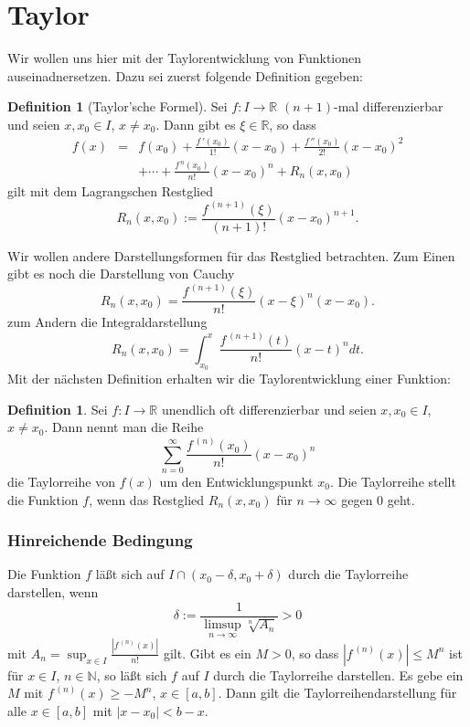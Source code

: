 \documentclass[fontsize=12pt,paper=a4,twoside,bibtotoc,idxtotoc,
liststotoc,pagesize,BCOR1.2cm,DIV15,chapterprefix,pagesize=pdftex]{scrbook}
\theoremstyle{plain}
\theoremstyle{definition}
\newtheorem{df}[equation]{Definition}
\theoremstyle{remark}
\begin{document}
\section{Taylor}
Wir wollen uns hier mit der Taylorentwicklung von Funktionen auseinadnersetzen. Dazu sei zuerst folgende Definition gegeben:
\begin{df}[Taylor'sche Formel]
Sei $f:I \rightarrow \mathbb{R}$ $(n+1)$-mal differenzierbar und seien
$x,x_0 \in I$, $x \neq x_0$. Dann gibt es $\xi \in \mathbb{R}$, so
dass
\begin{eqnarray*}
f(x)& = & f(x_0) + \frac{f\,'(x_0)}{1!}(x-x_0)+
\frac{f\,''(x_0)}{2!}(x-x_0)^2\\[0.5cm]
 & & + \cdots + \frac{f^{\,n}(x_0)}{n!}(x-x_0)^n +R_n(x,x_0) 
\end{eqnarray*}
gilt mit dem Lagrangschen Restglied
\[ R_n(x,x_0) := \frac{f^{\,(n+1)}(\xi)}{(n+1)!} (x-x_0)^{n+1}. \]
\end{df}
Wir wollen andere Darstellungsformen für das Restglied betrachten.
Zum Einen gibt es noch die Darstellung von Cauchy
\[ R_n(x,x_0)= \frac{f^{\,(n+1)}(\xi)}{n!} (x- \xi)^{n}(x-x_0).\]
zum Andern die Integraldarstellung
\[ R_n(x,x_0)= \int_{x_0}^x \frac{f^{\,(n+1)}(t)}{n!}  (x-t)^n dt.\]
Mit der nächsten Definition erhalten wir die Taylorentwicklung einer Funktion:
\begin{df}
Sei $f:I \rightarrow \mathbb{R}$ unendlich oft  differenzierbar und seien
$x,x_0 \in I$, $x \neq x_0$. Dann nennt man die Reihe
\[ \sum_{n=0}^\infty \frac{f^{\,(n)}(x_0)}{n!}(x-x_0)^n \]
die Taylorreihe von $f(x)$ um den Entwicklungspunkt $x_0$.
\bigskip
Die Taylorreihe stellt die Funktion $f$, wenn das Restglied $R_n(x,x_0)$ für $n
\rightarrow \infty$ gegen $0$ geht.
\end{df}

\subsubsection{Hinreichende Bedingung}

 Die Funktion $f$ läßt sich auf $I\cap (x_0-\delta, x_0+\delta)$ durch die Taylorreihe darstellen, wenn
\[
\delta:= \frac{1}{\limsup_{n \rightarrow \infty} \sqrt[n]{A_n}}>0
 \]
mit $A_n=\sup_{x \in I}  \frac{|f^{\,(n)}(x)|}{n!}$ gilt.
 Gibt es ein $M>0$, so dass $|f^{\,(n)}(x)|\leq M^n$ ist für $x \in
I$, $n \in \mathbb{N}$, so läßt sich $f$ auf $I$ durch die Taylorreihe
darstellen.
 Es gebe ein $M$ mit  $f^{\,(n)}(x)\geq -M^n$, $x \in [a,b]$. Dann
gilt die Taylorreihendarstellung für alle $x \in [a,b]$ mit
$|x-x_0|<b-x$. 
\end{document}
